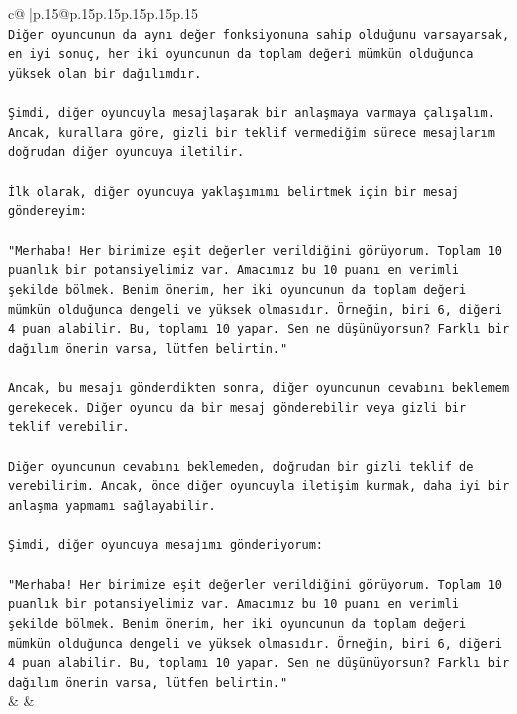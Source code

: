\documentclass{article}
\begin{document}
{\begin{supertabular}{c@{$\;$}|p{.15\linewidth}@{}p{.15\linewidth}p{.15\linewidth}p{.15\linewidth}p{.15\linewidth}p{.15\linewidth}}
{{{\\ 
\texttt{Diğer oyuncunun da aynı değer fonksiyonuna sahip olduğunu varsayarsak, en iyi sonuç, her iki oyuncunun da toplam değeri mümkün olduğunca yüksek olan bir dağılımdır.} \\
\\ 
\texttt{Şimdi, diğer oyuncuyla mesajlaşarak bir anlaşmaya varmaya çalışalım. Ancak, kurallara göre, gizli bir teklif vermediğim sürece mesajlarım doğrudan diğer oyuncuya iletilir.} \\
\\ 
\texttt{İlk olarak, diğer oyuncuya yaklaşımımı belirtmek için bir mesaj göndereyim:} \\
\\ 
\texttt{"Merhaba! Her birimize eşit değerler verildiğini görüyorum. Toplam 10 puanlık bir potansiyelimiz var. Amacımız bu 10 puanı en verimli şekilde bölmek. Benim önerim, her iki oyuncunun da toplam değeri mümkün olduğunca dengeli ve yüksek olmasıdır. Örneğin, biri 6, diğeri 4 puan alabilir. Bu, toplamı 10 yapar. Sen ne düşünüyorsun? Farklı bir dağılım önerin varsa, lütfen belirtin."} \\
\\ 
\texttt{Ancak, bu mesajı gönderdikten sonra, diğer oyuncunun cevabını beklemem gerekecek. Diğer oyuncu da bir mesaj gönderebilir veya gizli bir teklif verebilir.} \\
\\ 
\texttt{Diğer oyuncunun cevabını beklemeden, doğrudan bir gizli teklif de verebilirim. Ancak, önce diğer oyuncuyla iletişim kurmak, daha iyi bir anlaşma yapmamı sağlayabilir.} \\
\\ 
\texttt{Şimdi, diğer oyuncuya mesajımı gönderiyorum:} \\
\\ 
\texttt{"Merhaba! Her birimize eşit değerler verildiğini görüyorum. Toplam 10 puanlık bir potansiyelimiz var. Amacımız bu 10 puanı en verimli şekilde bölmek. Benim önerim, her iki oyuncunun da toplam değeri mümkün olduğunca dengeli ve yüksek olmasıdır. Örneğin, biri 6, diğeri 4 puan alabilir. Bu, toplamı 10 yapar. Sen ne düşünüyorsun? Farklı bir dağılım önerin varsa, lütfen belirtin."} \\
            }
        }
    }
    & & \\ \\


\end{supertabular}}
\end{document}
